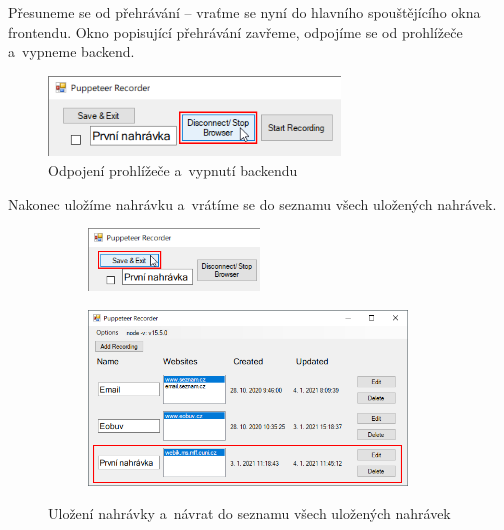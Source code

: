 \documentclass[12pt, a4paper, twoside]{article}
\begin{document}
	Přesuneme se od přehrávání -- vraťme se nyní do hlavního spouštějícího okna frontendu. Okno popisující přehrávání zavřeme, odpojíme se od prohlížeče a~vypneme backend. 
	\begin{figure}[H]
		\centering
		\includegraphics[width=0.69\textwidth]{disconnectFromBrowser.png}
		\caption{Odpojení prohlížeče a~vypnutí backendu}
	\end{figure}
	\newpage
	Nakonec uložíme nahrávku a~vrátíme se do seznamu všech uložených nahrávek.
	\begin{figure}[H]
		\centering
		\begin{subfigure}[t]{1.0\textwidth}
			\centering
			\includegraphics[width=0.50\textwidth]{saveAndExit.png}
		\end{subfigure}
	\end{figure}
	\vspace{-0.7cm}
	\begin{figure}[H]\ContinuedFloat
		\centering
		\textdownarrow
	\end{figure}
	\vspace{-0.6cm}
	\begin{figure}[H]\ContinuedFloat
		\centering
		\begin{subfigure}[t]{1.0\textwidth}
			\centering
			\includegraphics[width=0.93\textwidth]{mainPage.png}
		\end{subfigure}
		\caption{Uložení nahrávky a~návrat do seznamu všech uložených nahrávek}
	\end{figure}
\end{document}
